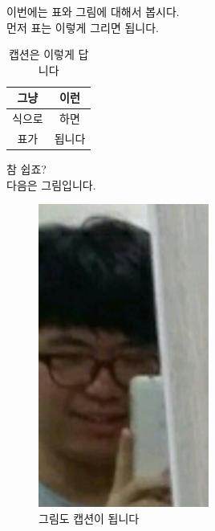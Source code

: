 \documentclass{article}
\begin{document}
	\doublespacing
	\noindent 이번에는 표와 그림에 대해서 봅시다.\\
	먼저 표는 이렇게 그리면 됩니다.
	\begin{table}[hp]
		\centering
		\begin{tabular}{|c|c|}
			\hline
			그냥 & 이런\\
			\hline
			식으로 & 하면\\
			\hline
			표가 & 됩니다\\
			\hline
		\end{tabular}
	\caption{캡션은 이렇게 답니다}
	\label{tab:eg}
	\end{table}
	참 쉽죠?\\
	다음은 그림입니다.
	\begin{figure}[hp]
		\includegraphics[width=0.5\textwidth]{TaeKyeong.jpg}
		\caption{그림도 캡션이 됩니다}
		\label{fig:eg}
	\end{figure}
\end{document}
